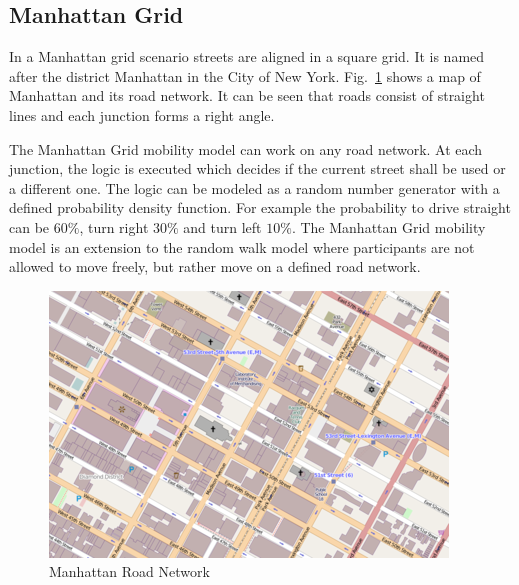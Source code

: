 \documentclass[master,english]{hgbthesis}
\begin{document}
\subsection{Manhattan Grid}

In a Manhattan grid scenario streets are aligned in a square grid. It is named after the district Manhattan in the City of New York. Fig.\ \ref{fig:manhattan} shows a map of Manhattan and its road network. It can be seen that roads consist of straight lines and each junction forms a right angle.

The Manhattan Grid mobility model can work on any road network. At each junction, the logic is executed which decides if the current street shall be used or a different one. The logic can be modeled as a random number generator with a defined probability density function. For example the probability to drive straight can be $60\%$, turn right $30\%$ and turn left $10\%$. The Manhattan Grid mobility model is an extension to the random walk model where participants are not allowed to move freely, but rather move on a defined road network.

\begin{figure}

	\centering

	\includegraphics[width=\linewidth]{./images/manhattan.png}

	\caption{Manhattan Road Network}

	\label{fig:manhattan}

\end{figure}

\end{document}
